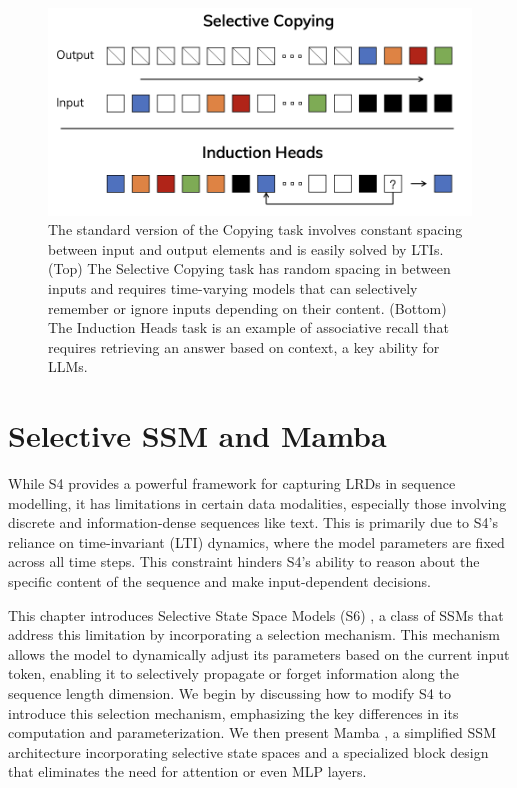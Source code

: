 \documentclass[12pt,a4paper]{report}
\begin{document}
\begin{figure}[ht]
    \centerline{\includegraphics[scale=0.75]{C3.2.6_SelectiveC_InductionH.png}}
    \caption{ The standard version of the Copying task involves constant spacing between input and output elements and is easily solved by LTIs. (Top) The Selective Copying task has random spacing in between inputs and requires time-varying models that can selectively remember or ignore inputs depending on their content. (Bottom) The Induction Heads task is an example of associative recall that requires retrieving an answer based on context, a key ability for LLMs.}
    \label{selective-copy-induction-heads}
\end{figure}

\chapter{Selective SSM and Mamba}

While S4 \cite{s4} provides a powerful framework for capturing LRDs in sequence modelling, it has limitations in certain data modalities, especially those involving discrete and information-dense sequences like text. This is primarily due to S4's reliance on time-invariant (LTI) dynamics, where the model parameters are fixed across all time steps. This constraint hinders S4's ability to reason about the specific content of the sequence and make input-dependent decisions.

\medskip

This chapter introduces Selective State Space Models (S6) \cite{mamba}, a class of SSMs that address this limitation by incorporating a selection mechanism. This mechanism allows the model to dynamically adjust its parameters based on the current input token, enabling it to selectively propagate or forget information along the sequence length dimension. We begin by discussing how to modify S4 to introduce this selection mechanism, emphasizing the key differences in its computation and parameterization. We then present Mamba \cite{mamba}, a simplified SSM architecture incorporating selective state spaces and a specialized block design that eliminates the need for attention or even MLP layers.
\end{document}
